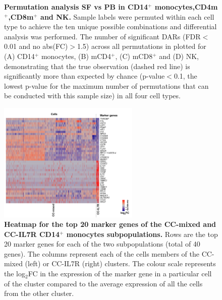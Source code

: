 \begin{figure}[htbp]
\begin{subfigure}[b]{0.45\textwidth}
\caption{}
\end{subfigure}
\caption[Permutation analysis SF vs PB in CD14$^+$ monocytes,CD4m$^+$,CD8m$^+$ and NK.]{\textbf{Permutation analysis SF vs PB in CD14$^+$ monocytes,CD4m$^+$,CD8m$^+$ and NK.} Sample labels were permuted within each cell type to achieve the ten unique possible combinations and differential analysis was performed. The number of significant DARs (FDR$<$0.01 and no abs(FC)$>$1.5) across all permutations in plotted for (A) CD14$^+$ monocytes, (B) mCD4$^+$, (C) mCD8$^+$ and (D) NK, demonstrating that the true observation (dashed red line) is significantly more than expected by chance (p-value$<$0.1, the lowest p-value for the maximum number of permutations that can be conducted with this sample size) in all four cell types.}
\label{figure:PsA_perm_analysis}
\end{figure}



\begin{figure}[htbp]
\centering
\includegraphics[width=0.6\textwidth]{./Appendix/pdfs/Chapter5/PSA_10X_heatmap_SF_PB_monocytes_clusters_mixed_and_IL7R}
\caption[Heatmap for the top 20 marker genes of the CC-mixed and CC-IL7R CD14$^+$ monocytes subpopulations.]{\textbf{Heatmap for the top 20 marker genes of the CC-mixed and CC-IL7R CD14$^+$ monocytes subpopulations.} Rows are the top 20 marker genes for each of the two subpopulations (total of 40 genes). The columns represent each of the cells members of the CC-mixed (left) or CC-IL7R (right) clusters. The colour scale represents the log$_2$FC in the expression of the marker gene in a particular cell of the cluster compared to the average expression of all the cells from the other cluster.}
\label{figure:PSA_scRNAseq_CC_mixed_and_IL7R_markers_heatmap}
\end{figure}

